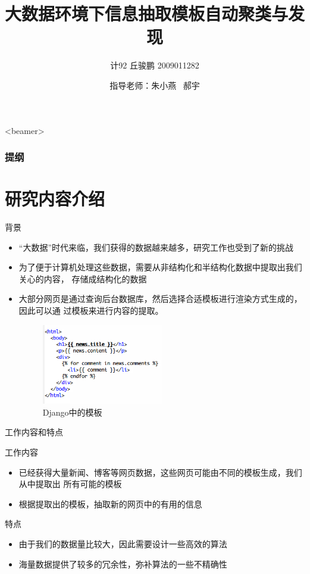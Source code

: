 \documentclass[presentation]{beamer}
\author{计92 丘骏鹏 2009011282}
\date{指导老师：朱小燕~ 郝宇}
\title{大数据环境下信息抽取模板自动聚类与发现}
\begin{document}
\maketitle
\begin{frame}<beamer>\frametitle{提纲}\tableofcontents\end{frame}
\section{研究内容介绍}
\label{sec-1}
\begin{frame}[label=sec-1-1]{背景}
\begin{itemize}
\item “大数据”时代来临，我们获得的数据越来越多，研究工作也受到了新的挑战
\item 为了便于计算机处理这些数据，需要从非结构化和半结构化数据中提取出我们关心的内容，
存储成结构化的数据
\item 大部分网页是通过查询后台数据库，然后选择合适模板进行渲染方式生成的，因此可以通
过模板来进行内容的提取。
\begin{figure}[htb]
\centering
\includegraphics[width=0.5\textwidth]{./django.png}
\caption{\label{fig:django}Django中的模板}
\end{figure}
\end{itemize}
\end{frame}

\begin{frame}[label=sec-1-2]{工作内容和特点}
\begin{block}{工作内容}
\begin{itemize}
\item 已经获得大量新闻、博客等网页数据，这些网页可能由不同的模板生成，我们从中提取出
所有可能的模板
\item 根据提取出的模板，抽取新的网页中的有用的信息
\end{itemize}
\end{block}

\begin{block}{特点}
\begin{itemize}
\item 由于我们的数据量比较大，因此需要设计一些高效的算法
\item 海量数据提供了较多的冗余性，弥补算法的一些不精确性
\end{itemize}
\end{block}
\end{frame}
\end{document}
